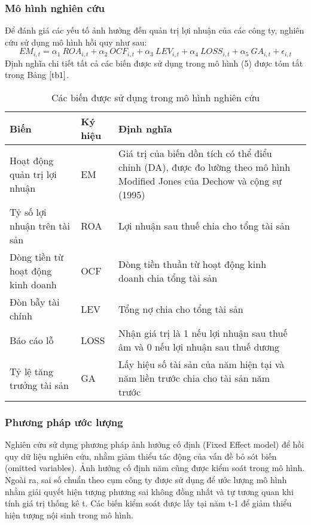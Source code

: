 \documentclass[a4paper]{article}
\begin{document}
\subsubsection{Mô hình nghiên cứu}
Để đánh giá các yếu tố ảnh hưởng đến quản trị lợi nhuận của các công ty, nghiên cứu sử dụng mô hình hồi quy như sau:
\begin{equation}
EM_{i,t} = \alpha_1 \ ROA_{i,t} + \alpha_2 \ OCF_{i,t} + \alpha_3 \ LEV_{i,t} + \alpha_4 \ LOSS_{i,t} + \alpha_5 \ GA_{i,t}+ \epsilon_{i,t}
\end{equation}
Định nghĩa chi tiết tất cả các biến được sử dụng trong mô hình (5) được tóm tắt trong Bảng $\ref{tb1}$.
\begin{table}[h!]
\centering\caption{Các biến được sử dụng trong mô hình nghiên cứu}
\label{tb1}
\begin{tabular}{lp{1.5cm}p{6.5cm}p{3cm}}
\toprule
Biến & Ký hiệu & Định nghĩa\\
\midrule
Hoạt động quản trị lợi nhuận & EM & Giá trị của biến dồn tích có thể điểu chỉnh (DA), được đo lường theo mô hình Modified Jones của Dechow và cộng sự (1995) \\
Tỷ số lợi nhuận trên tài sản & ROA & Lợi nhuận sau thuế chia cho tổng tài sản \\
Dòng tiền từ hoạt động kinh doanh & OCF & Dòng tiền thuần từ hoạt động kinh doanh chia tổng tài sản \\
Đòn bẫy tài chính & LEV & Tổng nợ chia cho tổng tài sản \\
Báo cáo lỗ & LOSS & Nhận giá trị là 1 nếu lợi nhuận sau thuế âm và 0 nếu lợi nhuận sau thuế dương \\
Tỷ lệ tăng trưởng tài sản & GA & Lấy hiệu số tài sản của năm hiện tại và năm liền trước chia cho tài sản năm trước \\
\bottomrule
\end{tabular}
\end{table}
\subsubsection{Phương pháp ước lượng}
Nghiên cứu sử dụng phương pháp ảnh hưởng cố định (Fixed Effect model) để hồi quy dữ liệu nghiên cứu, nhằm giảm thiểu tác động của vấn đề bỏ sót biến (omitted variables). Ảnh hưởng cố định năm cũng được kiểm soát trong mô hình. Ngoài ra, sai số chuẩn theo cụm công ty được sử dụng để ước lượng mô hình nhằm giải quyết hiện tượng phương sai không đồng nhất và tự tương quan khi tính giá trị thống kê t. Các biến kiểm soát được lấy tại năm t-1 để giảm thiểu hiện tượng nội sinh trong mô hình.
\end{document}
